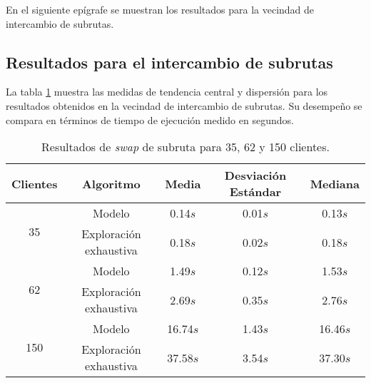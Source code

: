 \documentclass[12pt]{report}
\begin{document}
En el siguiente epígrafe se muestran los resultados para la vecindad de intercambio de subrutas.

\subsection{Resultados para el intercambio de subrutas}
\label{sec:Resultados para el intercambio de subrutas}

La tabla \ref{tab:swap_subruta} muestra las medidas de tendencia central y dispersión para los resultados obtenidos en la vecindad de intercambio de subrutas. Su desempeño se compara en términos de tiempo de ejecución medido en segundos.

\begin{table}[h]
	\centering
	\begin{tabular}{|c|c|c|c|c|}
		\hline
		\textbf{Clientes} & \textbf{Algoritmo} & \textbf{Media} & \textbf{Desviación Estándar} & \textbf{Mediana} \\
		\hline
		\multirow{2}{*}{35} & Modelo & 0.14$s$ & 0.01$s$ & 0.13$s$ \\
							& Exploración exhaustiva & 0.18$s$ & 0.02$s$ & 0.18$s$ \\
		\hline
		\multirow{2}{*}{62} & Modelo & 1.49$s$ & 0.12$s$ & 1.53$s$ \\
							& Exploración exhaustiva & 2.69$s$ & 0.35$s$ & 2.76$s$ \\
		\hline
		\multirow{2}{*}{150} & Modelo & 16.74$s$ & 1.43$s$ & 16.46$s$ \\
							& Exploración exhaustiva & 37.58$s$ & 3.54$s$ & 37.30$s$ \\
		\hline
	\end{tabular}
	\caption{Resultados de \textit{swap} de subruta para 35, 62 y 150 clientes.}
	\label{tab:swap_subruta}
\end{table}
\end{document}
